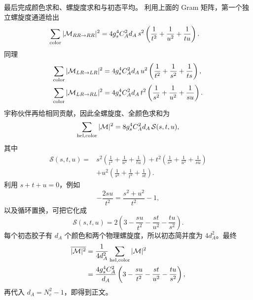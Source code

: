 \begin{derivation}
最后完成颜色求和、螺旋度求和与初态平均。
利用上面的 Gram 矩阵，第一个独立螺旋度通道给出
\begin{align*}
 \sum_{\rm color}|\mathcal M_{RR\to RR}|^2
 &=4g_s^4C_A^2d_A\,s^2
 \left(
 \frac1{t^2}+\frac1{u^2}+\frac1{tu}
 \right).
\end{align*}
同理
\begin{align*}
 \sum_{\rm color}|\mathcal M_{LR\to LR}|^2
 &=4g_s^4C_A^2d_A\,u^2
 \left(
 \frac1{t^2}+\frac1{s^2}+\frac1{ts}
 \right),\\
 \sum_{\rm color}|\mathcal M_{LR\to RL}|^2
 &=4g_s^4C_A^2d_A\,t^2
 \left(
 \frac1{s^2}+\frac1{u^2}+\frac1{su}
 \right).
\end{align*}
宇称伙伴再给相同贡献，因此全螺旋度、全颜色求和为
\begin{equation*}
 \sum_{\rm hel,color}|\mathcal M|^2
 =8g_s^4C_A^2d_A\,\mathcal S(s,t,u),
\end{equation*}
其中
\begin{align*}
 \mathcal S(s,t,u)={}&
 s^2\left(\frac1{t^2}+\frac1{u^2}+\frac1{tu}\right)
 +t^2\left(\frac1{s^2}+\frac1{u^2}+\frac1{su}\right)\\
 &+u^2\left(\frac1{s^2}+\frac1{t^2}+\frac1{st}\right).
\end{align*}
利用 $s+t+u=0$，例如
\begin{equation*}
 -\frac{2su}{t^2}
 =\frac{s^2+u^2}{t^2}-1,
\end{equation*}
以及循环置换，可把它化成
\begin{equation*}
 \mathcal S(s,t,u)
 =2\left(
 3-\frac{su}{t^2}-\frac{st}{u^2}-\frac{tu}{s^2}
 \right).
\end{equation*}
每个初态胶子有 $d_A$ 个颜色和两个物理螺旋度，所以初态简并度为 $4d_A^2$。最终
\begin{align*}
 \overline{|\mathcal M|^2}
 &=\frac{1}{4d_A^2}
 \sum_{\rm hel,color}|\mathcal M|^2\\
 &=\frac{4g_s^4C_A^2}{d_A}
 \left(
 3-\frac{su}{t^2}-\frac{st}{u^2}-\frac{tu}{s^2}
 \right),
\end{align*}
再代入 $d_A=N_c^2-1$，即得到正文。
\end{derivation}
